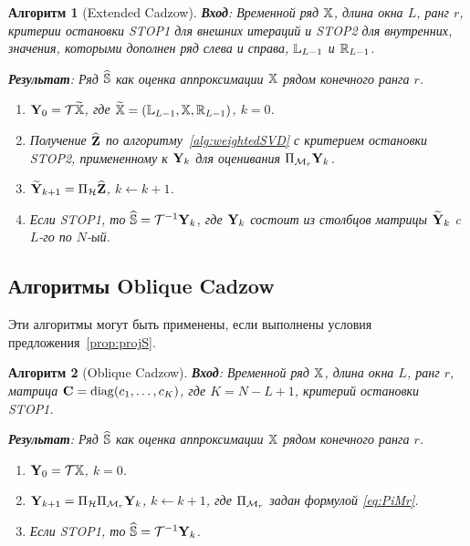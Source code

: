 \documentclass[12pt,a4paper,fleqn,leqno]{article}
\newtheorem{algorithm}{Алгоритм}
\begin{document}
\begin{algorithm}[Extended Cadzow]
\textbf{Вход}: Временной ряд $\mathbb{X}$, длина окна $L$, ранг $r$,
критерии остановки STOP1 для внешних итераций и STOP2 для внутренних,
значения, которыми дополнен ряд слева и справа, $\mathbb{L}_{L-1}$ и $\mathbb{R}_{L-1}$.

\textbf{Результат}:
Ряд $\widehat{\mathbb{S}}$ как оценка аппроксимации $\mathbb{X}$ рядом конечного ранга $r$.

\begin{enumerate}
\item
$\mathbf{Y}_0 = \mathcal{T} \widetilde{\mathbb{X}}$, где $\widetilde{\mathbb{X}}=(\mathbb{L}_{L-1}, \mathbb{X}, \mathbb{R}_{L-1})$, $k=0$.
\item
Получение $\widehat{\mathbf{Z}}$ по алгоритму~\ref{alg:weightedSVD} с критерием остановки STOP2, примененному к $\mathbf{Y}_k$ для оценивания $\Pi_{\mathcal{M}_r} \mathbf{Y}_{k}$.
\item
$\widetilde{\mathbf{Y}}_{k+1} = \Pi_{\mathcal{H}}  \widehat{\mathbf{Z}}$, $k\leftarrow k+1$.
\item
Если STOP1, то $\widehat{\mathbb{S}} = \mathcal{T}^{-1} \mathbf{Y}_k$, где $\mathbf{Y}_k$ состоит из столбцов матрицы $\widetilde{\mathbf{Y}}_{k}$
c $L$-го по $N$-ый.
\end{enumerate}
\end{algorithm}


\subsection{Алгоритмы Oblique Cadzow}

Эти алгоритмы могут быть применены, если выполнены условия предложения~\ref{prop:projS}.

\begin{algorithm}[Oblique Cadzow]
\label{alg:obliqueCadzow}
\textbf{Вход}: Временной ряд $\mathbb{X}$, длина окна $L$, ранг $r$, матрица $\mathbf{C}=\mathop{\mathrm{diag}}(c_1,\ldots, c_K)$, где $K=N-L+1$,
критерий остановки STOP1.

\textbf{Результат}:
Ряд $\widehat{\mathbb{S}}$ как оценка аппроксимации $\mathbb{X}$ рядом конечного ранга $r$.

\begin{enumerate}
\item
$\mathbf{Y}_0 = \mathcal{T} \mathbb{X}$, $k=0$.
\item
$\mathbf{Y}_{k+1} = \Pi_{\mathcal{H}}  \Pi_{\mathcal{M}_r} \mathbf{Y}_{k}$, $k\leftarrow k+1$, где
$\Pi_{\mathcal{M}_r}$ задан формулой \eqref{eq:PiMr}.
\item
Если STOP1, то $\widehat{\mathbb{S}} = \mathcal{T}^{-1} \mathbf{Y}_k$.
\end{enumerate}
\end{algorithm}
\end{document}
